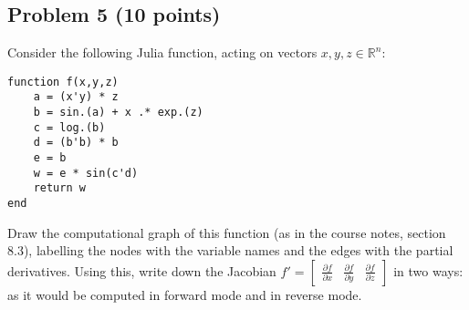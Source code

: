 \documentclass[10pt,oneside]{article}
\begin{document}
\subsection*{Problem 5 (10 points)}

Consider the following Julia function, acting on vectors $x,y,z \in \mathbb{R}^n$:

\begin{verbatim}
function f(x,y,z)
    a = (x'y) * z
    b = sin.(a) + x .* exp.(z)
    c = log.(b)
    d = (b'b) * b
    e = b
    w = e * sin(c'd)
    return w
end
\end{verbatim}

Draw the computational graph of this function (as in the course notes, section 8.3), labelling the nodes with the variable names and the edges with the partial derivatives.   Using this, write down the Jacobian $f' = \begin{bmatrix} \frac{\partial f}{\partial x} & \frac{\partial f}{\partial y} & \frac{\partial f}{\partial z} \end{bmatrix}$ in two ways: as it would be computed in forward mode and in reverse mode.
\end{document}

